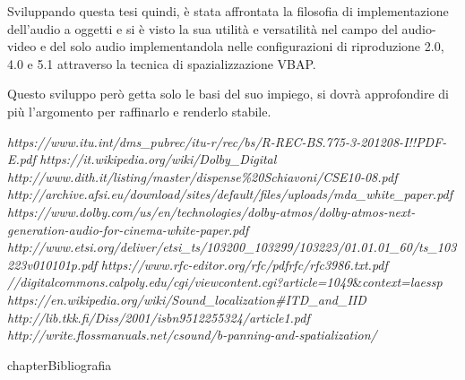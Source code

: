 \documentclass[12pt,a4paper]{report}
\begin{document}
Sviluppando questa tesi quindi, è stata affrontata la filosofia di implementazione dell'audio a oggetti e si è visto la sua utilità e versatilità nel campo del audio-video e del solo audio implementandola nelle configurazioni di riproduzione 2.0, 4.0 e 5.1 attraverso la tecnica di spazializzazione VBAP.

Questo sviluppo però getta solo le basi del suo impiego, si dovrà approfondire di più l'argomento per raffinarlo e renderlo stabile.





\begin{thebibliography}{}

 \textit{https://www.itu.int/dms\_pubrec/itu-r/rec/bs/R-REC-BS.775-3-201208-I!!PDF-E.pdf}
 \textit{https://it.wikipedia.org/wiki/Dolby\_Digital}
 \textit{http://www.dith.it/listing/master/dispense\%20Schiavoni/CSE10-08.pdf}
 \textit{http://archive.afsi.eu/download/sites/default/files/uploads/mda\_white\_paper.pdf}
 \textit{https://www.dolby.com/us/en/technologies/dolby-atmos/dolby-atmos-next-generation-audio-for-cinema-white-paper.pdf}
\textit{http://www.etsi.org/deliver/etsi\_ts/103200\_103299/103223/01.01.01\_60/ts\_103223v010101p.pdf}
 \textit{https://www.rfc-editor.org/rfc/pdfrfc/rfc3986.txt.pdf}
\textit{//digitalcommons.calpoly.edu/cgi/viewcontent.cgi?article=1049}\&\textit{context=laessp}
 \textit{https://en.wikipedia.org/wiki/Sound\_localization\#ITD\_and\_IID}
 \textit{http://lib.tkk.fi/Diss/2001/isbn9512255324/article1.pdf}
 \textit{http://write.flossmanuals.net/csound/b-panning-and-spatialization/}
\end{thebibliography}

 {chapter}{Bibliografia}
\end{document}

